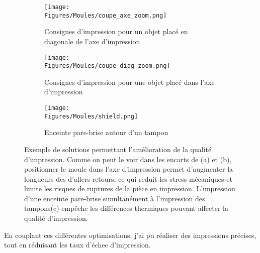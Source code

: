 \documentclass[\main/main.tex]{subfiles}
\begin{document}
\begin{figure}[h!]
    \centering
    \begin{subfigure}[b]{0.30\textwidth}
       \centering \caption{
            \label{fig:print:axe}
            Consignes d'impression pour un objet placé en diagonale de l'axe d'impression
            }
       \centering \texttt{[image: \\Figures/Moules/coupe\_axe\_zoom.png]}
    \end{subfigure}
    \begin{subfigure}[b]{0.30\textwidth}
       \centering \caption{
            \label{fig:print:diag}
            Consignes d'impression pour une objet placé dans l'axe d'impression
            }
       \centering \texttt{[image: \\Figures/Moules/coupe\_diag\_zoom.png]}
    \end{subfigure}
    \begin{subfigure}[b]{0.30\textwidth}
       \centering \caption{
            \label{fig:print:shield}
            Enceinte pare-brise autour d'un tampon
            }
       \centering \texttt{[image: \\Figures/Moules/shield.png]}
    \end{subfigure}
    \caption{
        \label{fig:print}
        Exemple de solutions permettant l'amélioration de la qualité d'impression.
        \newline
        Comme on peut le voir dans les encarts de (a) et (b), positionner le moule dans l'axe d'impression permet d'augmenter la longueurs des d'allers\hyp{}retours, ce qui reduit les stress mécaniques et limite les risques de ruptures de la pièce en impression.
        L'impression d'une enceinte pare-brise  simultanément à l'impression des tampons(c) empêche les différences thermiques pouvant affecter la qualité d'impression.
    }
\end{figure}

%
En couplant ces différentes optimisations, j'ai pu réaliser des impressions précises, tout en réduisant les taux d'échec d'impression.
\end{document}
